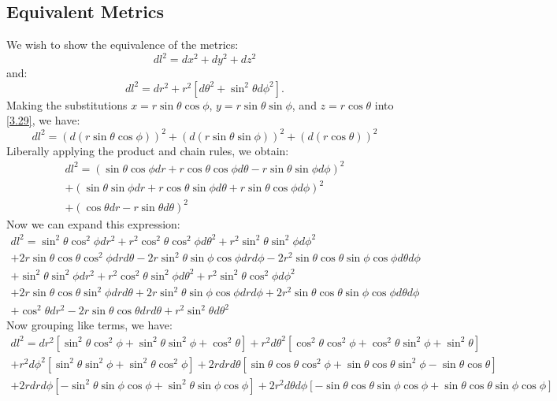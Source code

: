 \subsection{Equivalent Metrics}
We wish to show the equivalence of the metrics:
\begin{equation}\label{3.29}
    dl^2 = dx^2 + dy^2 + dz^2
\end{equation}
and:
\begin{equation}\label{3.30}
    dl^2 = dr^2 + r^2\left[d\theta^2 + \sin^2\theta d\phi^2\right].
\end{equation}
Making the substitutions $x = r\sin\theta\cos\phi$, $y = r\sin\theta\sin\phi$, and $z = r\cos\theta$ into \eqref{3.29}, we have:
\begin{equation}
    dl^2 = (d(r\sin\theta\cos\phi))^2 + (d(r\sin\theta\sin\phi))^2 + (d(r\cos\theta))^2
\end{equation}
Liberally applying the product and chain rules, we obtain:
\begin{multline}
    dl^2 = (\sin\theta\cos\phi dr + r\cos\theta\cos\phi d\theta - r\sin\theta\sin\phi d\phi)^2
    \\ + (\sin\theta\sin\phi dr + r\cos\theta\sin\phi d\theta + r\sin\theta\cos\phi d\phi)^2
    \\ + (\cos\theta dr - r\sin\theta d\theta)^2
\end{multline}
Now we can expand this expression:
\begin{multline}
    dl^2 = \sin^2\theta \cos^2\phi dr^2 + r^2\cos^2\theta\cos^2\phi d\theta^2 + r^2\sin^2\theta\sin^2\phi d\phi^2
    \\ + 2r\sin\theta\cos\theta\cos^2\phi dr d\theta - 2r\sin^2\theta \sin\phi\cos\phi dr d\phi - 2r^2\sin\theta\cos\theta\sin\phi\cos\phi d\theta d\phi
    \\ + \sin^2\theta\sin^2\phi dr^2 + r^2\cos^2\theta\sin^2\phi d\theta^2 + r^2\sin^2\theta\cos^2\phi d\phi^2
    \\ + 2r\sin\theta\cos\theta\sin^2\phi drd\theta + 2r\sin^2\theta\sin\phi\cos\phi dr d\phi + 2r^2\sin\theta\cos\theta\sin\phi\cos\phi d\theta d\phi
    \\ + \cos^2\theta dr^2 - 2r\sin\theta\cos\theta dr d\theta + r^2\sin^2\theta d\theta^2
\end{multline}
Now grouping like terms, we have:
\begin{multline}
    dl^2 = dr^2\left[\sin^2\theta \cos^2\phi + \sin^2\theta\sin^2\phi + \cos^2\theta\right] + r^2 d\theta^2\left[\cos^2\theta\cos^2\phi + \cos^2\theta\sin^2\phi + \sin^2\theta\right]
    \\ + r^2d\phi^2 \left[\sin^2\theta\sin^2\phi + \sin^2\theta\cos^2\phi\right] + 2r drd\theta \left[\sin\theta\cos\theta\cos^2\phi + \sin\theta\cos\theta\sin^2\phi - \sin\theta\cos\theta\right]
    \\ + 2rdrd\phi \left[-\sin^2\theta \sin\phi\cos\phi + \sin^2\theta\sin\phi\cos\phi\right] + 2r^2d\theta d\phi\left[-\sin\theta\cos\theta\sin\phi\cos\phi + \sin\theta\cos\theta\sin\phi\cos\phi\right]
\end{multline}
